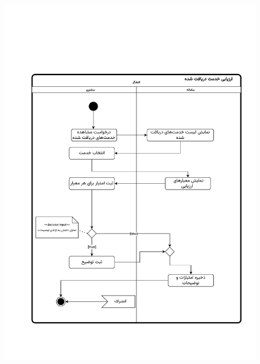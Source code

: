 \begin{figure}[ht!]
	\centering
	\includegraphics[scale=0.6, page=1]{figs/OOD-activity-evaluatereqrecv.pdf}
\end{figure}
\FloatBarrier
\newpage

